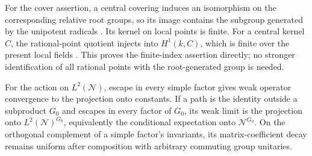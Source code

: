 For the cover assertion, a central covering induces an isomorphism
on the corresponding relative root groups, so its image contains
the subgroup generated by the unipotent radicals
\cite[Theorem~2.20(iii) and Proposition~2.24(ii)]{BT1972Complements}.
Its kernel on local points is finite.  For a central kernel $C$,
the rational-point quotient injects into $H^1(k,C)$, which is finite
over the present local fields
\cite[Propositions~1.12 and~1.17, Theorem~6.1]{BorelSerre1964}.
This proves the finite-index assertion directly; no stronger
identification of all rational points with the root-generated
group is needed.


\begin{lemma}
\label{lem:setup-product-mixing}
For the action on $L^2(\mathcal N)$, escape in every simple factor
gives weak operator convergence to the projection onto constants.
If a path is the identity outside a subproduct $G_0$ and escapes in
every factor of $G_0$, its weak limit is the projection onto
$L^2(\mathcal N)^{G_0}$, equivalently the conditional expectation
onto $\mathcal N^{G_0}$.  On the orthogonal complement of a simple
factor's invariants, its matrix-coefficient decay remains uniform
after composition with arbitrary commuting group unitaries.
\end{lemma}

